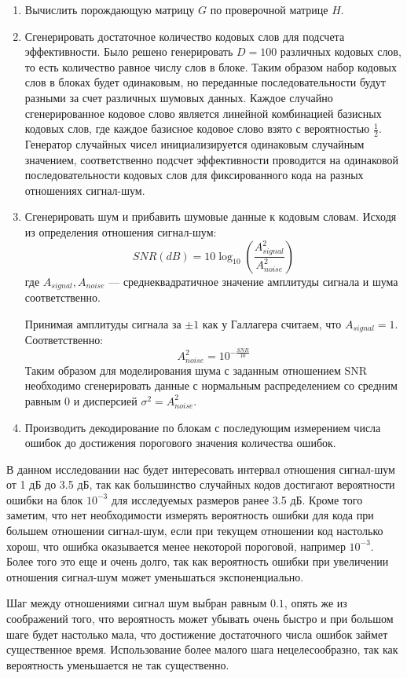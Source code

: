 \begin{enumerate}
	\item Вычислить порождающую матрицу $G$ по проверочной матрице $H$.
	\item Сгенерировать достаточное количество кодовых слов для подсчета эффективности.
	Было решено генерировать $D=100$ различных кодовых слов, то есть количество равное числу слов в
	блоке. Таким образом набор кодовых слов в блоках будет одинаковым, но переданные последовательности
	будут разными за счет различных шумовых данных.
	Каждое случайно сгенерированное кодовое слово является линейной комбинацией базисных кодовых
	слов, где каждое базисное кодовое слово взято с вероятностью $\frac{1}{2}$. Генератор случайных 
	чисел инициализируется одинаковым случайным значением, соответственно подсчет эффективности
	проводится на одинаковой последовательности кодовых слов для фиксированного кода на разных
	отношениях сигнал-шум.
	\item Сгенерировать шум и прибавить шумовые данные к кодовым словам. Исходя из определения
	отношения сигнал-шум:
	\[
		SNR(dB)=10\log_{10}\left(\frac{A_{signal}^2}{A_{noise}^2}\right)
	\]
	где $A_{signal},A_{noise}$ --- среднеквадратичное значение амплитуды сигнала и шума соответственно. 
	
	Принимая амплитуды сигнала за $\pm1$ как у Галлагера считаем, что $A_{signal}=1$. Соответственно:
	\[
		A_{noise}^2 = 10^{-\frac{SNR}{10}} 
	\]
	Таким образом для моделирования шума с заданным отношением SNR необходимо сгенерировать
	данные с нормальным распределением со средним равным $0$ и дисперсией $\sigma^2=A_{noise}^2$.
	\item Производить декодирование по блокам с последующим измерением числа ошибок до достижения
	порогового значения количества ошибок.
\end{enumerate}

В данном исследовании нас будет интересовать интервал 
отношения сигнал-шум от 1 дБ до 3.5 дБ, так как большинство
случайных кодов достигают вероятности ошибки на блок $10^{-3}$
для исследуемых размеров ранее 3.5 дБ. Кроме того заметим,
что нет необходимости измерять вероятность ошибки
для кода при большем отношении
сигнал-шум, если при текущем отношении код настолько хорош,
что ошибка оказывается менее некоторой пороговой, например
$10^{-3}$. Более того это еще и очень долго,
так как вероятность ошибки при увеличении отношения сигнал-шум
может уменьшаться экспоненциально.

Шаг между отношениями сигнал шум выбран равным $0.1$,
опять же из соображений того, что вероятность может убывать
очень быстро и при большом шаге будет настолько мала, что
достижение достаточного числа ошибок займет существенное время.
Использование более малого шага нецелесообразно, так как
вероятность уменьшается не так существенно.

